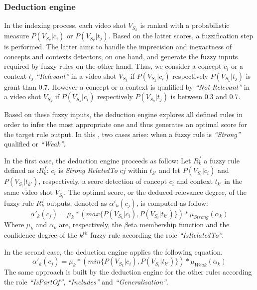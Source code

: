 		\subsubsection{Deduction engine}
		In the indexing process, each video shot $V_{S_{k}}$ is ranked with a probabilistic measure
		$P(V_{S_{k}}|c_{i})$ or  $P(V_{S_{k}}|t_{j})$. 
		Based on the latter scores, a fuzzification step is 
		performed. The latter aims to handle the imprecision and inexactness of concepts and contexts detectors, on one hand, 
		and generate the fuzzy inputs required by fuzzy rules on the other hand. Thus, we consider a concept $c_{i}$ 
		or a context $t_{j}$ \textit{“Relevant”} in a video shot $V_{S_{k}}$ if $P(V_{S_{k}}|c_{i})$ respectively $P(V_{S_{k}}|t_{j})$  is grant than $0.7$. However\revAnglais{,} a concept or a context 
		is qualified by \textit{“Not-Relevant”} in a video shot $V_{S_{k}}$ if  $P(V_{S_{k}}|c_{i})$ respectively $P(V_{S_{k}}|t_{j})$ is between $0.3$ and $0.7$. 
		 
		Based on these fuzzy inputs, the deduction engine explores all defined rules in order to infer the most appropriate one and 
		thus generates an optimal score for the target rule output. In this , two cases arise: when a fuzzy rule is \textit{“Strong”} qualified or \textit{“Weak”}. 
		 
		In the first case, the deduction engine proceeds as follow: Let $R^{f}_{k}$  a fuzzy rule defined as :$R^{f}_{k}$: $c_{i}$ is \textit{Strong RelatedTo} $c{j}$ within $t_{k'}$ and let $P(V_{S_{i}}|c_{i})$ and  $P(V_{S_{i}}|t_{k'})$, respectively, a score detection of concept $c_{i}$ and context $t_{k'}$ in the same video shot $V_{S_{i}}$. The optimal score, or the deduced relevance degree, of the fuzzy rule $R^{f}_{k}$ outputs, denoted as $\alpha'_{k}(c_{j})$, is computed as follow: 
		\begin{equation} 
			\alpha'_{k}(c_{j})=\mu_{k}*(max\{P(V_{S_{k}}|c_{i}),P(V_{S_{i}}|t_{k'})\})*\mu_{Strong}(\alpha_{k}) 
		\end{equation} 
		Where $\mu_{k}$ and $\alpha_{k}$ are, respectively, the $\beta$eta membership function and the confidence degree of the $k^{th}$ fuzzy rule according the role \textit{“IsRelatedTo”}. 
		 
		In the second case, the deduction engine applies the following equation. 
		\begin{equation} 
			\alpha'_{k}(c_{j})=\mu_{k}*(min\{P(V_{S_{k}}|c_{i}),P(V_{S_{i}}|t_{k'})\})*\mu_{Weak}(\alpha_{k}) 
		\end{equation} 
		The same approach is built by the deduction engine for the other rules according the role \textit{“IsPartOf”}, \textit{“Includes”} and \textit{“Generalisation”}. 

